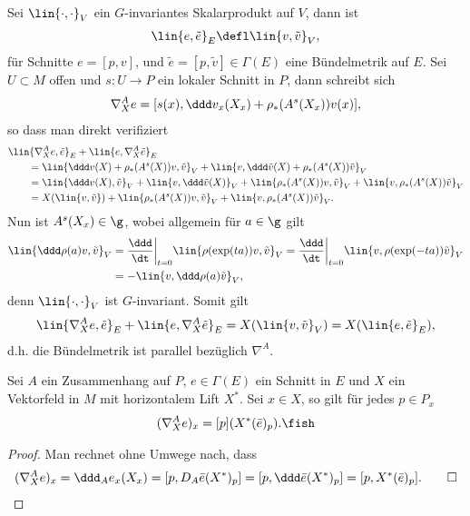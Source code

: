 \documentclass[%
	paper=a5,%
	fleqn,%
	DIV=18,%
	BCOR=0mm,
	fontsize=11pt,
	titlepage=false,%
	bibliography=totoc,
	DIV=18,%
	twoside=true,
	pdftitle=Riemannsche Geometrie,
	pdfauthor=Uwe Semmelmann,
	numbers=noendperiod]%
	{scrbook}
\begin{document}
\begin{rem}
Sei $\lin{\cdot,\cdot}_V$ ein $G$-invariantes Skalarprodukt auf $V$, dann ist
\begin{align*}
\lin{e,\tilde{e}}_E\defl  \lin{v,\tilde{v}}_V,
\end{align*}
für Schnitte $e = [p,v]$, und $\tilde{e}=[p,\tilde{v}]\in\Gamma(E)$
eine Bündelmetrik auf $E$. Sei $U\subset M$ offen und $s: U\to P$ ein lokaler
Schnitt in $P$, dann schreibt sich
\begin{align*}
\nabla_X^A e = [s(x),\ddd v_x(X_x) + \rho_*(A^s(X_x))v(x)],
\end{align*}
so dass man direkt verifiziert
\begin{align*}
&\lin{\nabla_X^A e,\tilde{e}}_E + \lin{e,\nabla_X^A \tilde{e}}_E \\ 
&\qquad = 
\lin{\ddd v(X) + \rho_*(A^s(X))v,\tilde{v}}_V + \lin{v,\ddd\tilde{v}(X) +
\rho_*(A^s(X))\tilde{v}}_V\\
&\qquad=
\lin{\ddd v(X),\tilde{v}}_V + 
\lin{v,\ddd \tilde{v}(X)}_V +
\lin{\rho_*(A^s(X))v,\tilde{v}}_V + \lin{v,\rho_*(A^s(X))\tilde{v}}_V\\
&\qquad=
X(\lin{v,\tilde{v}}) + \lin{\rho_*(A^s(X))v,\tilde{v}}_V +
\lin{v,\rho_*(A^s(X))\tilde{v}}_V.
\end{align*}
Nun ist $A^s(X_x)\in \g$, wobei allgemein für $a\in\g$ gilt
\begin{align*}
\lin{\ddd\rho(a)v,\tilde{v}}_V &= 
\frac{\ddd}{\dt}\bigg|_{t=0} \lin{\rho(\exp(ta))v,\tilde{v}}_V
=
\frac{\ddd}{\dt}\bigg|_{t=0} \lin{v,\rho(\exp(-ta))\tilde{v}}_V\\
&=
-\lin{v,\ddd\rho(a)\tilde{v}}_V,
\end{align*}
denn $\lin{\cdot,\cdot}_V$ ist $G$-invariant. Somit gilt
\begin{align*}
\lin{\nabla_X^A e,\tilde{e}}_E + \lin{e,\nabla_X^A \tilde{e}}_E = 
X(\lin{v,\tilde{v}}_V) = 
X(\lin{e,\tilde{e}}_E),
\end{align*}
d.h. die Bündelmetrik ist parallel bezüglich $\nabla^A$.\map
\end{rem}

\begin{lem}
Sei $A$ ein Zusammenhang auf $P$, $e\in \Gamma(E)$ ein Schnitt in $E$ und $X$
ein Vektorfeld in $M$ mit horizontalem Lift $X^*$. Sei $x\in X$, so gilt für
jedes $p\in P_x$
\begin{align*}
(\nabla_X^A e)_x = [p](X^*(\bar{e})_p).\fish
\end{align*} 
\end{lem}
\begin{proof}
Man rechnet ohne Umwege nach, dass
\begin{align*}
(\nabla_X^A e)_x = \ddd_A e_x(X_x) = 
[p,D_A \bar{e}(X^*)_p]
=
[p,\ddd \bar{e}(X^*)_p]
= [p,X^*(\bar{e})_p].\qed
\end{align*}
\end{proof}
\end{document}
